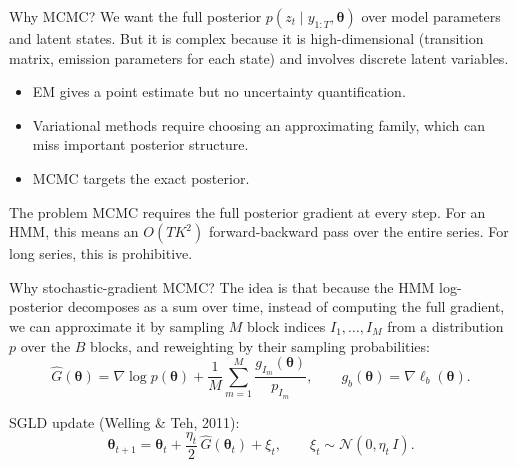 \documentclass[aspectratio=169]{beamer}
\newcommand{\btheta}{\boldsymbol{\theta}}
\begin{document}
\begin{frame}{Why MCMC?}
  We want the full posterior $p(z_t \mid y_{1:T}, \btheta)$ over model parameters and latent states. But it is complex because it is high-dimensional (transition matrix, emission parameters for each state) and involves discrete latent variables.

  \vspace{0.5em}
  \begin{itemize}
    \item EM gives a point estimate but no uncertainty quantification.
    \item Variational methods require choosing an approximating family, which can miss important posterior structure.
    \item MCMC targets the exact posterior.
  \end{itemize}

  \vspace{0.3em}
  \begin{block}{The problem}
    MCMC requires the full posterior gradient at every step. For an HMM, this means an $O(TK^2)$ forward-backward pass over the entire series. For long series, this is prohibitive.
  \end{block}
\end{frame}

\begin{frame}{Why stochastic-gradient MCMC?}
  The idea is that because the HMM log-posterior decomposes as a sum over time, instead of computing the full gradient, we can approximate it by sampling $M$ block indices $I_1, \dots, I_M$ from a distribution $p$ over the $B$ blocks, and reweighting by their sampling probabilities:
  \[
    \widehat G(\btheta)=
    \nabla\log p(\btheta)
    +
    \frac{1}{M}\sum_{m=1}^M
    \frac{g_{I_m}(\btheta)}{p_{I_m}},
    \qquad g_b(\btheta)=\nabla \ell_b(\btheta).
  \]

  SGLD update (Welling \& Teh, 2011):
  \[
    \btheta_{t+1} = \btheta_t + \frac{\eta_t}{2}\,\widehat{G}(\btheta_t) + \xi_t, \qquad \xi_t \sim \mathcal{N}(0, \eta_t\, I).
  \]
\end{frame}
\end{document}

